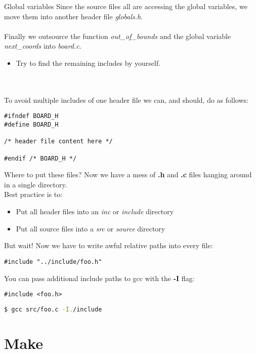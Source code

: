 \begin{frame}[fragile]{Global variables}
	Since the source files all are accessing the global variables, we move them into another header file \textit{globals.h}.\\\ \\
	Finally we outsource the function \textit{out\_of\_bounds} and the global variable \textit{next\_coords} into \textit{board.c}.\\
	\begin{itemize}
		\item Try to find the remaining includes by yourself.
	\end{itemize}\ \\\ \\
	To avoid multiple includes of one header file we can, and should, do as follows:
	\begin{lstlisting}
#ifndef BOARD_H
#define BOARD_H

/* header file content here */

#endif /* BOARD_H */
\end{lstlisting}
\end{frame}

\begin{frame}[fragile]{Where to put these files?}
Now we have a mess of \textbf{.h} and \textbf{.c} files hanging around in a single directory.\\
Best practice is to:
\begin{itemize}
	\item Put all header files into an \textit{inc} or \textit{include} directory
	\item Put all source files into a \textit{src} or \textit{source} directory
\end{itemize}
\pause
\bigskip
But wait! Now we have to write awful relative paths into every file:
\begin{lstlisting}
#include "../include/foo.h"
\end{lstlisting}
\pause
\bigskip
You can pass additional include paths to gcc with the \textbf{-I} flag:
\begin{lstlisting}
#include <foo.h>
\end{lstlisting}
\begin{lstlisting}[language=bash]
$ gcc src/foo.c -I./include
\end{lstlisting}

\end{frame}

\section{Make}
